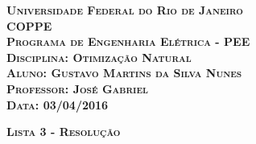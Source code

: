 \begin{titlepage}
\begin{flushleft}

\textsc{\textbf{\LARGE Universidade Federal do Rio de Janeiro}}\\[0.5cm]
\textsc{\textbf{\LARGE COPPE}}\\[0.5cm]
\textsc{\textbf{\LARGE Programa de Engenharia Elétrica - PEE}}\\[0.5cm]
\textsc{\textbf{\LARGE Disciplina: Otimização Natural}}\\[0.5cm]
\textsc{\textbf{\LARGE Aluno: Gustavo Martins da Silva Nunes}}\\[0.5cm]
\textsc{\textbf{\LARGE Professor: José Gabriel}}\\[0.5cm]
\textsc{\textbf{\LARGE Data: 03/04/2016}}\\[6.5cm]

\end{flushleft}
\begin{center}
\textsc{\textbf{\huge Lista 3 - Resolução}}
\vfill
\end{center}
\end{titlepage}